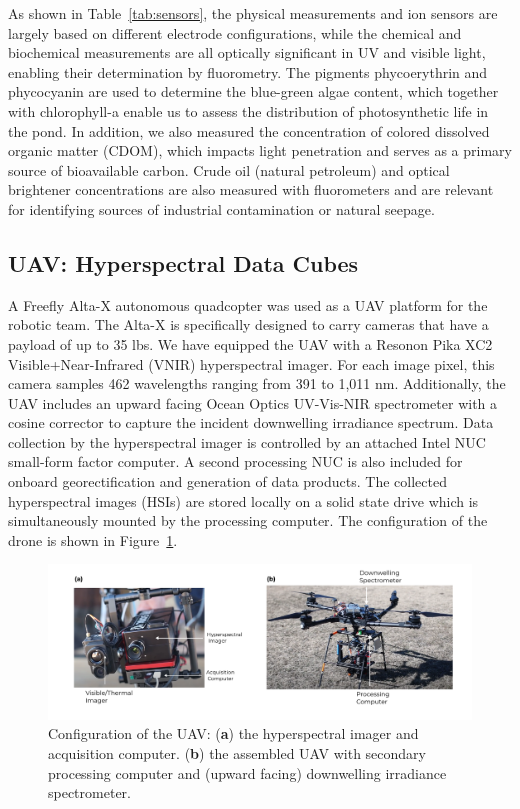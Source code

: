 \documentclass[remotesensing,article,submit,pdftex,moreauthors]{Definitions/mdpi}
\begin{document}
As shown in Table~\ref{tab:sensors}, the physical measurements and ion sensors are largely based on different electrode configurations, while the chemical and biochemical measurements are all optically significant in UV and visible light, enabling their determination by fluorometry. The pigments phycoerythrin and phycocyanin are used to determine the blue-green algae content, which together with chlorophyll-a enable us to assess the distribution of photosynthetic life in the pond. In addition, we also measured the concentration of colored dissolved organic matter (CDOM), which impacts light penetration and serves as a primary source of bioavailable carbon. Crude oil (natural petroleum) and optical brightener concentrations are also measured with fluorometers and are relevant for identifying sources of industrial contamination or natural seepage.

\subsection{UAV: Hyperspectral Data Cubes}

A Freefly Alta-X autonomous quadcopter was used as a UAV platform for the robotic team. The Alta-X is specifically designed to carry cameras that have a payload of up to 35 lbs. We have equipped the UAV with a Resonon Pika XC2 Visible+Near-Infrared (VNIR) hyperspectral imager. For each image pixel, this camera samples 462 wavelengths ranging from 391 to 1,011 nm.  Additionally, the UAV includes an upward facing Ocean Optics UV-Vis-NIR spectrometer with a cosine corrector to capture the incident downwelling irradiance spectrum. Data collection by the hyperspectral imager is controlled by an attached Intel NUC small-form factor computer. A second processing NUC is also included for onboard georectification and generation of data products. The collected hyperspectral images (HSIs) are stored locally on a solid state drive which is simultaneously mounted by the processing computer. The configuration of the drone is shown in Figure~\ref{fig:drone-components}.

\begin{figure}[H]
\includegraphics[width=\columnwidth]{paper/figures/materials-and-methods/annotated-drone.pdf}
\caption{Configuration of the UAV: (\textbf{a}) the hyperspectral imager and acquisition computer. (\textbf{b}) the assembled UAV with secondary processing computer and (upward facing) downwelling irradiance spectrometer. \label{fig:drone-components}}
\end{figure} 
\end{document}
